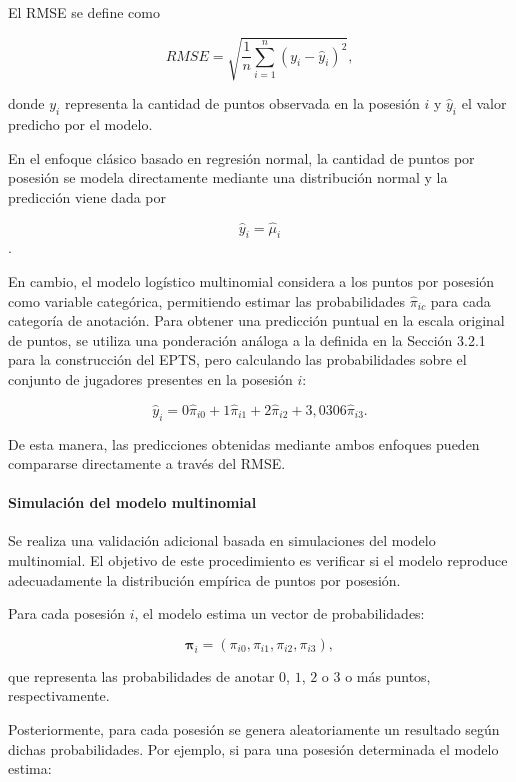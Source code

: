 \documentclass[
  12pt,
]{article}
\begin{document}
El RMSE se define como

\begin{equation}
RMSE=
\sqrt{
\frac{1}{n}
\sum_{i=1}^{n}
(y_i-\hat y_i)^2
},
\end{equation}

donde \(y_i\) representa la cantidad de puntos observada en la posesión
\(i\) y \(\hat y_i\) el valor predicho por el modelo.

En el enfoque clásico basado en regresión normal, la cantidad de puntos
por posesión se modela directamente mediante una distribución normal y
la predicción viene dada por

\[\hat{y}_i = \hat{\mu}_i\].

En cambio, el modelo logístico multinomial considera a los puntos por
posesión como variable categórica, permitiendo estimar las
probabilidades \(\hat{\pi}_{ic}\) para cada categoría de anotación. Para
obtener una predicción puntual en la escala original de puntos, se
utiliza una ponderación análoga a la definida en la Sección 3.2.1 para
la construcción del EPTS, pero calculando las probabilidades sobre el
conjunto de jugadores presentes en la posesión \(i\):

\[
\hat{y}_i = 
0\hat{\pi}_{i0}
+1\hat{\pi}_{i1}
+2\hat{\pi}_{i2}
+3,0306\hat{\pi}_{i3}.
\]

De esta manera, las predicciones obtenidas mediante ambos enfoques
pueden compararse directamente a través del RMSE.

\paragraph{Simulación del modelo
multinomial}\label{simulaciuxf3n-del-modelo-multinomial}

Se realiza una validación adicional basada en simulaciones del modelo
multinomial. El objetivo de este procedimiento es verificar si el modelo
reproduce adecuadamente la distribución empírica de puntos por posesión.

Para cada posesión \(i\), el modelo estima un vector de probabilidades:

\[
\boldsymbol{\pi}_i = (\pi_{i0},\pi_{i1},\pi_{i2},\pi_{i3}),
\]

que representa las probabilidades de anotar \(0\), \(1\), \(2\) o \(3\)
o más puntos, respectivamente.

Posteriormente, para cada posesión se genera aleatoriamente un resultado
según dichas probabilidades. Por ejemplo, si para una posesión
determinada el modelo estima:
\end{document}
